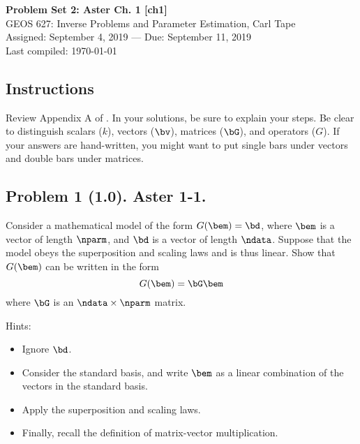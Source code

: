 \documentclass[11pt,titlepage,fleqn]{article}
\begin{document}

\begin{spacing}{1.2}
\centering
{\large \bf Problem Set 2: Aster Ch. 1 [ch1]} \\
GEOS 627: Inverse Problems and Parameter Estimation, Carl Tape \\
Assigned: September 4, 2019 --- Due: September 11, 2019 \\
Last compiled: \today
\end{spacing}


\subsection*{Instructions}

Review Appendix A of \citet{AsterE2}. In your solutions, be sure to explain your steps. Be clear to distinguish scalars ($k$), vectors ($\bv$), matrices ($\bG$), and operators ($G$). If your answers are hand-written, you might want to put single bars under vectors and double bars under matrices.

\subsection*{Problem 1 (1.0). Aster 1-1.}

Consider a mathematical model of the form $G(\bem) = \bd$, where $\bem$ is a vector of length $\nparm$, and $\bd$ is a vector of length $\ndata$. Suppose that the model obeys the superposition and scaling laws and is thus linear. Show that $G(\bem)$ can be written in the form
%
\begin{equation}
G(\bem) = \bG\bem
\end{equation}
%
where $\bG$ is an $\ndata \times \nparm$ matrix.

\medskip\noindent
Hints:
%
\begin{itemize}
\item Ignore $\bd$.
\item Consider the standard basis, and write $\bem$ as a linear combination of the vectors in the standard basis.
\item Apply the superposition and scaling laws.
\item Finally, recall the definition of matrix-vector multiplication.
\end{itemize}

\end{document}
